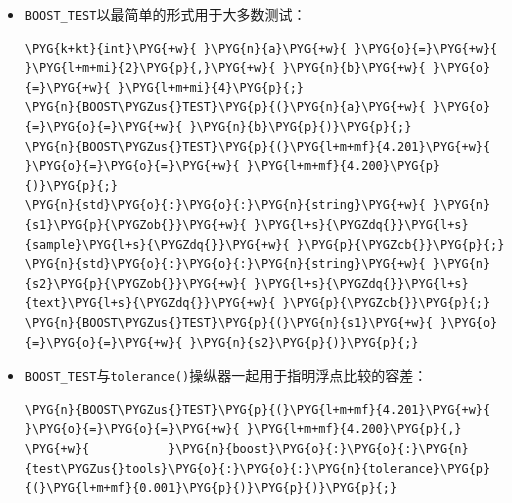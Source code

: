 \begin{itemize}
\item \texttt{BOOST\_\allowbreak{}TEST}以最简单的形式用于大多数测试：



\begin{codeblockbg}
\begin{Verbatim}[commandchars=\\\{\},breaklines=true,breakanywhere=true,fontsize=\codefont,xleftmargin=17bp]
\PYG{k+kt}{int}\PYG{+w}{ }\PYG{n}{a}\PYG{+w}{ }\PYG{o}{=}\PYG{+w}{ }\PYG{l+m+mi}{2}\PYG{p}{,}\PYG{+w}{ }\PYG{n}{b}\PYG{+w}{ }\PYG{o}{=}\PYG{+w}{ }\PYG{l+m+mi}{4}\PYG{p}{;}
\PYG{n}{BOOST\PYGZus{}TEST}\PYG{p}{(}\PYG{n}{a}\PYG{+w}{ }\PYG{o}{=}\PYG{o}{=}\PYG{+w}{ }\PYG{n}{b}\PYG{p}{)}\PYG{p}{;}
\PYG{n}{BOOST\PYGZus{}TEST}\PYG{p}{(}\PYG{l+m+mf}{4.201}\PYG{+w}{ }\PYG{o}{=}\PYG{o}{=}\PYG{+w}{ }\PYG{l+m+mf}{4.200}\PYG{p}{)}\PYG{p}{;}
\PYG{n}{std}\PYG{o}{:}\PYG{o}{:}\PYG{n}{string}\PYG{+w}{ }\PYG{n}{s1}\PYG{p}{\PYGZob{}}\PYG{+w}{ }\PYG{l+s}{\PYGZdq{}}\PYG{l+s}{sample}\PYG{l+s}{\PYGZdq{}}\PYG{+w}{ }\PYG{p}{\PYGZcb{}}\PYG{p}{;}
\PYG{n}{std}\PYG{o}{:}\PYG{o}{:}\PYG{n}{string}\PYG{+w}{ }\PYG{n}{s2}\PYG{p}{\PYGZob{}}\PYG{+w}{ }\PYG{l+s}{\PYGZdq{}}\PYG{l+s}{text}\PYG{l+s}{\PYGZdq{}}\PYG{+w}{ }\PYG{p}{\PYGZcb{}}\PYG{p}{;}
\PYG{n}{BOOST\PYGZus{}TEST}\PYG{p}{(}\PYG{n}{s1}\PYG{+w}{ }\PYG{o}{=}\PYG{o}{=}\PYG{+w}{ }\PYG{n}{s2}\PYG{p}{)}\PYG{p}{;}
\end{Verbatim}
\end{codeblockbg}



\item \texttt{BOOST\_\allowbreak{}TEST}与\texttt{tolerance()}操纵器一起用于指明浮点比较的容差：



\begin{codeblockbg}
\begin{Verbatim}[commandchars=\\\{\},breaklines=true,breakanywhere=true,fontsize=\codefont,xleftmargin=17bp]
\PYG{n}{BOOST\PYGZus{}TEST}\PYG{p}{(}\PYG{l+m+mf}{4.201}\PYG{+w}{ }\PYG{o}{=}\PYG{o}{=}\PYG{+w}{ }\PYG{l+m+mf}{4.200}\PYG{p}{,}
\PYG{+w}{           }\PYG{n}{boost}\PYG{o}{:}\PYG{o}{:}\PYG{n}{test\PYGZus{}tools}\PYG{o}{:}\PYG{o}{:}\PYG{n}{tolerance}\PYG{p}{(}\PYG{l+m+mf}{0.001}\PYG{p}{)}\PYG{p}{)}\PYG{p}{;}
\end{Verbatim}
\end{codeblockbg}



\end{itemize}
